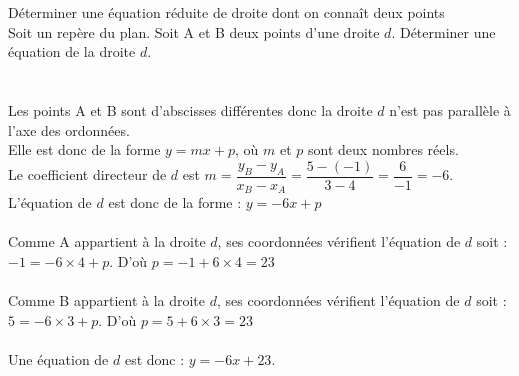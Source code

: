 \documentclass[11pt,a4paper]{article}  %
\begin{document}
	\pagestyle{empty}
	\graphicspath{{images/}}
	
	\vspace*{-2cm}
	
	\begin{center}
	\end{center}

\begin{methodeTitre}{Déterminer une équation réduite de droite dont on connaît deux points}
	\\
	Soit \Rij un repère du plan. Soit A et B deux points d'une droite $d$.
	Déterminer une équation de la droite $d$.\\
	\ \\
	\\
	Les points A et B sont d'abscisses différentes donc la droite $d$ n'est pas parallèle à l'axe des ordonnées.\\ Elle est donc de la forme $y = mx + p$, où $m$ et $p$ sont deux nombres réels.\\
	Le coefficient directeur de $d$ est $m =  \dfrac{y_B-y_A}{x_B-x_A}=\dfrac{5-(-1)}{3-4}=\dfrac{6}{-1} = -6$.\\
	L'équation de $d$ est donc de la forme : $y = -6x + p$\\
	\\
	Comme A appartient à la droite $d$, ses coordonnées vérifient l'équation de $d$ soit :\\
	$-1 = -6 \times 4 + p$. D'où  $p = -1 + 6 \times 4 = 23$\\
	\\
	Comme B appartient à la droite $d$, ses coordonnées vérifient l'équation de $d$ soit :\\
	$5 = -6 \times 3 + p$. D'où  $p = 5 + 6 \times 3 = 23$\\
	\ \\
	Une équation de $d$ est donc :  $y = - 6x + 23$.
\end{methodeTitre}
\ \\
\ \\
\ \\
	\begin{center}
\end{center}
\end{document}
